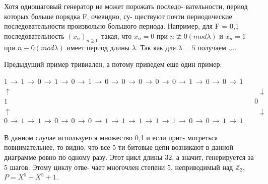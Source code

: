 \begin{mynotice}
Хотя одношаговый генератор не может порожать последо- \linebreak \indent вательности, период которых больше порядка F, очевидно, су- \linebreak \indent ществуют почти периодические последовательности произвольно \linebreak \indent большого периода. Например, для F = {0,1} последовательность \linebreak \indent $(x_{n})_{n \geqslant 0}$ такая, что $x_{n} = 0$ при $n \not\equiv 0 (mod \lambda)$ и $x_{n} = 1$ при \linebreak \indent $n \equiv 0 (mod \lambda)$ имеет период длины $\lambda$. Так как для $\lambda = 5$ получаем \linebreak {}.... \par 
Предыдущий пример тривиален, а потому приведем еще один \linebreak пример: \par 
\noindent $1 \, \to \, 1 \, \to \, 0 \, \to \, 1 \, \to \, 0 \, \to \, 1 \, \to \, 0 \, \to \, 0 \, \to \, 0 \, \to \, 0 \, \to \, 0 \, \to \, 1 \, \to \, 0 \, \to \, 0 \, \to \, 1$ \linebreak
$\uparrow \;\;\;\;\;\;\;\;\;\;\;\;\;\;\;\;\;\;\;\;\;\;\;\;\;\;\;\;\;\;\;\;\;\;\;\;\;\;\;\;\;\;\;\;\;\;\;\;\;\;\;\;\;\;\;\;\;\;\;\;\;\;\;\;\;\;\;\;\;\;\;\;\;\;\;\;\;\;\;\;\;\;\;\;\;\;\;\;\;\;\;\;\;\;\;\;\;\;\;\;\;\;\;\;\;\;\;\;\;\;\;\;\;\;\;\;\;\;\;\;\;\;\;\;\;\;\downarrow$ \linebreak
$ 1 \;\;\;\;\;\;\;\;\;\;\;\;\;\;\;\;\;\;\;\;\;\;\;\;\;\;\;\;\;\;\;\;\;\;\;\;\;\;\;\;\;\;\;\;\;\;\;\;\;\;\;\;\;\;\;\;\;\;\;\;\;\;\;\;\;\;\;\;\;\;\;\;\;\;\;\;\;\;\;\;\;\;\;\;\;\;\;\;\;\;\;\;\;\;\;\;\;\;\;\;\;\;\;\;\;\;\;\;\;\;\;\;\;\;\;\;\;\;\;\;\;\;\;\;\;\; 0$ \linebreak
$\uparrow \;\;\;\;\;\;\;\;\;\;\;\;\;\;\;\;\;\;\;\;\;\;\;\;\;\;\;\;\;\;\;\;\;\;\;\;\;\;\;\;\;\;\;\;\;\;\;\;\;\;\;\;\;\;\;\;\;\;\;\;\;\;\;\;\;\;\;\;\;\;\;\;\;\;\;\;\;\;\;\;\;\;\;\;\;\;\;\;\;\;\;\;\;\;\;\;\;\;\;\;\;\;\;\;\;\;\;\;\;\;\;\;\;\;\;\;\;\;\;\;\;\;\;\;\;\;\downarrow$ \linebreak
\noindent $0 \, \to \, 1 \, \to \, 1 \, \to \, 0 \, \to \, 0 \, \to \, 0 \, \to \, 1 \, \to \, 1 \, \to \, 1 \, \to \, 1 \, \to \, 1 \, \to \, 0 \, \to \, 0 \, \to \, 1 \, \to \, 1$ \linebreak

\indent В данном случае используется множество {0,1} и если приc- \linebreak мотреться повнимательнее, то видно, что все 5-ти битовые цепи \linebreak возникают в данной диаграмме ровно по одному разу. Этот цикл \linebreak длины 32, а значит, генерируется за 5 шагов. Этому циклу отве- \linebreak чает многочлен степени 5, неприводимый над $\mathbb{Z}_{2}$, $P = X^{5} + X^{5} + 1$.
\end{mynotice}
\newpage

